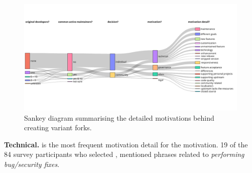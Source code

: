 \begin{figure}[ht]
\begin{center}
    \centering
    \includegraphics[width=\textwidth]{pdfs/sankey_motivations_2.pdf}
    \caption{Sankey diagram summarising the detailed motivations behind creating variant forks.
    }
    \label{fig:sankey_motivation}
\end{center}
\vspace{-.3cm}
\end{figure}

\nd \textbf{Technical.}  is the most frequent motivation detail for the  motivation. 19 of the 84 survey participants who selected , mentioned phrases related to \emph{performing bug/security fixes}.

